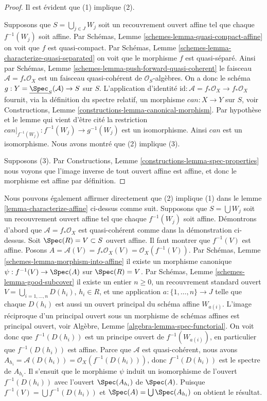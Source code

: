 \begin{proof}
Il est évident que (1) implique (2).

\medskip\noindent
Supposons que $S = \bigcup_{j \in J} W_j$ soit un recouvrement ouvert
affine tel que chaque $f^{-1}(W_j)$
soit affine. Par Schémas, Lemme \ref{schemes-lemma-quasi-compact-affine}
on voit que $f$
est quasi-compact. Par Schémas, Lemme \ref{schemes-lemma-characterize-quasi-separated}
on voit que le morphisme $f$ est
quasi-séparé. Ainsi par Schémas, Lemme \ref{schemes-lemma-push-forward-quasi-coherent} le
faisceau $\mathcal{A} = f_*\mathcal{O}_X$ est un faisceau quasi-cohérent
de $\mathcal{O}_S$-algèbres. On a donc le schéma
$g : Y = \underline{\Spec}_S(\mathcal{A}) \to S$ sur $S$. L'application
d'identité
$\text{id} : \mathcal{A} = f_*\mathcal{O}_X \to f_*\mathcal{O}_X$ fournit, via la définition du spectre
relatif, un morphisme $can : X \to Y$ sur $S$,
voir Constructions, Lemme
\ref{constructions-lemma-canonical-morphism}. Par hypothèse et le lemme qui vient
d'être cité la restriction
$can|_{f^{-1}(W_j)} : f^{-1}(W_j) \to g^{-1}(W_j)$ est un isomorphisme. Ainsi $can$
est un isomorphisme. Nous avons montré
que (2) implique (3).

\medskip\noindent
Supposons (3). Par Constructions, Lemme \ref{constructions-lemma-spec-properties} nous voyons que l'image
inverse de tout ouvert affine est affine, et donc le morphisme
est affine par définition.
\end{proof}

\begin{remark}
\label{remark-direct-argument}
Nous pouvons également affirmer directement
que (2) implique (1) dans le lemme \ref{lemma-characterize-affine}
ci-dessus comme suit. Supposons que $S = \bigcup W_j$
soit un recouvrement ouvert
affine tel que chaque $f^{-1}(W_j)$ soit affine. Démontrons
d’abord que $\mathcal{A} = f_*\mathcal{O}_X$
est quasi-cohérent comme dans
la démonstration ci-dessus. Soit $\Spec(R) = V \subset S$
ouvert affine. Il faut montrer que $f^{-1}(V)$ est affine.
Posons $A = \mathcal{A}(V) = f_*\mathcal{O}_X(V) = \mathcal{O}_X(f^{-1}(V))$. Par Schémas, Lemme \ref{schemes-lemma-morphism-into-affine} il
existe un morphisme canonique $\psi : f^{-1}(V) \to \Spec(A)$ sur
$\Spec(R) = V$.
Par Schémas, Lemme \ref{schemes-lemma-good-subcover} il existe un entier $n \geq 0$,
un recouvrement standard ouvert
$V = \bigcup_{i = 1, \ldots, n} D(h_i)$, $h_i \in R$, et une application $a : \{1, \ldots, n\} \to J$
telle que chaque $D(h_i)$ est aussi un ouvert
principal du schéma affine $W_{a(i)}$. L'image réciproque
d'un principal ouvert sous un morphisme de schémas affines
est principal ouvert, voir Algèbre, Lemme \ref{algebra-lemma-spec-functorial}.
On voit donc que $f^{-1}(D(h_i))$ est un principe ouvert
de $f^{-1}(W_{a(i)})$, en particulier que $f^{-1}(D(h_i))$ est affine.
Parce que $\mathcal{A}$
est quasi-cohérent, nous avons $A_{h_i} = \mathcal{A}(D(h_i)) = \mathcal{O}_X(f^{-1}(D(h_i)))$, donc $f^{-1}(D(h_i))$
est le spectre de $A_{h_i}$.
Il s'ensuit que le morphisme $\psi$ induit un isomorphisme
de l'ouvert $f^{-1}(D(h_i))$ avec l'ouvert
$\Spec(A_{h_i})$ de $\Spec(A)$. Puisque $f^{-1}(V) = \bigcup f^{-1}(D(h_i))$
et $\Spec(A) = \bigcup \Spec(A_{h_i})$ on obtient le résultat.
\end{remark}

